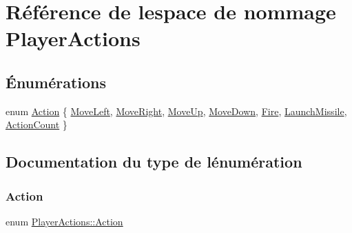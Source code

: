 \hypertarget{namespace_player_actions}{}\section{Référence de l\textquotesingle{}espace de nommage Player\+Actions}
\label{namespace_player_actions}
\subsection*{Énumérations}
\begin{DoxyCompactItemize}
\item 
enum \hyperlink{namespace_player_actions_a91477c99e0c44a0a9d0cc8153359ace2}{Action} \{ \newline
\hyperlink{namespace_player_actions_a91477c99e0c44a0a9d0cc8153359ace2a2f50c122278ef64f18f498ec0c0b30bb}{Move\+Left}, 
\hyperlink{namespace_player_actions_a91477c99e0c44a0a9d0cc8153359ace2a66f27d717d8d7af858f67723f023497e}{Move\+Right}, 
\hyperlink{namespace_player_actions_a91477c99e0c44a0a9d0cc8153359ace2ab5dca8f5ca85481589ad2d20f7c2a715}{Move\+Up}, 
\hyperlink{namespace_player_actions_a91477c99e0c44a0a9d0cc8153359ace2adfbc7b813317b0c6243ace079442b583}{Move\+Down}, 
\newline
\hyperlink{namespace_player_actions_a91477c99e0c44a0a9d0cc8153359ace2aff1a7726e9767c78998dedc1994d141c}{Fire}, 
\hyperlink{namespace_player_actions_a91477c99e0c44a0a9d0cc8153359ace2adb58e0137308ee9f72b903493c9abbf4}{Launch\+Missile}, 
\hyperlink{namespace_player_actions_a91477c99e0c44a0a9d0cc8153359ace2a0a8acdb5408de8ca64d70415f0a26f63}{Action\+Count}
 \}
\end{DoxyCompactItemize}


\subsection{Documentation du type de l\textquotesingle{}énumération}
\hypertarget{namespace_player_actions_a91477c99e0c44a0a9d0cc8153359ace2}{}\label{namespace_player_actions_a91477c99e0c44a0a9d0cc8153359ace2} 
\subsubsection{\texorpdfstring{Action}{Action}}
{\footnotesize\ttfamily enum \hyperlink{namespace_player_actions_a91477c99e0c44a0a9d0cc8153359ace2}{Player\+Actions\+::\+Action}}

